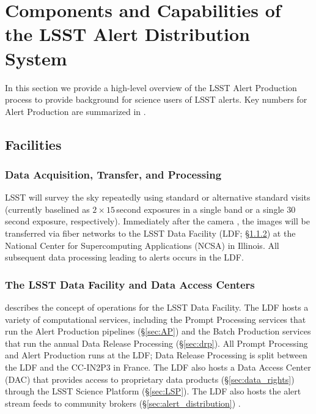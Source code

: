 \section{Components and Capabilities of the LSST Alert Distribution System}\label{sec:components}

In this section we provide a high-level overview of the LSST Alert Production process to provide background for science users of LSST alerts.
Key numbers for Alert Production are summarized in .

\subsection{Facilities}

\subsubsection{Data Acquisition, Transfer, and Processing}

LSST will survey the sky repeatedly using standard or alternative standard visits (currently baselined as $2\times15$\,second exposures in a single band or a single 30\,second exposure, respectively).
Immediately after the camera , the images will be transferred via fiber networks to the LSST Data Facility (LDF; \S \ref{sec:LDF}) at the National Center for Supercomputing Applications (NCSA) in Illinois.
All subsequent data processing leading to alerts occurs in the LDF.

\subsubsection{The LSST Data Facility and Data Access Centers} \label{sec:LDF}

 describes the concept of operations for the LSST Data Facility.
The LDF hosts a variety of computational services, including the Prompt Processing services that run the Alert Production pipelines (\S \ref{sec:AP}) and the Batch Production services that run the annual Data Release Processing (\S \ref{sec:drp}).
All Prompt Processing and Alert Production runs at the LDF;
Data Release Processing is split between the LDF and the CC-IN2P3 in France.
The LDF also hosts a Data Access Center (DAC) that provides access to proprietary data products (\S \ref{sec:data_rights}) through the LSST Science Platform (\S \ref{sec:LSP}).
The LDF also hosts the alert stream feeds to community brokers (\S \ref{sec:alert_distribution}) .

